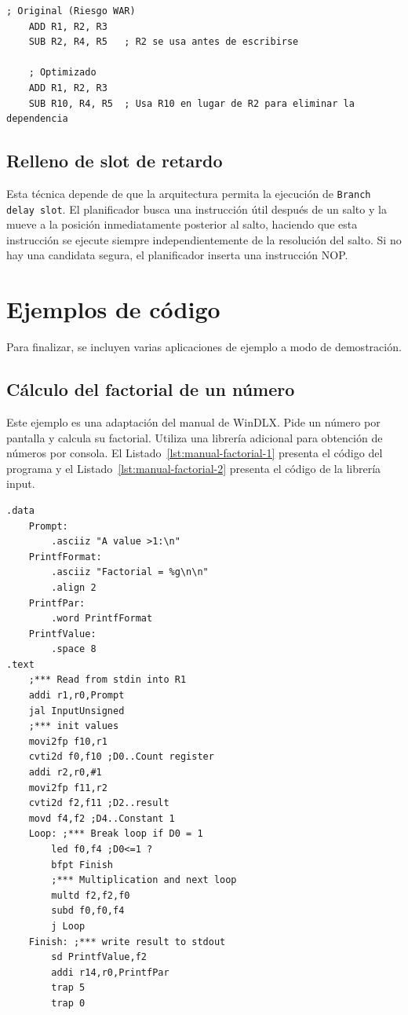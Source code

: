 \documentclass[../main.tex]{subfiles}
\begin{document}
\begin{lstlisting}[caption={Ejemplo de renombrado de registros.},label={lst:manual-renombrado}]
	; Original (Riesgo WAR)
	ADD R1, R2, R3
	SUB R2, R4, R5   ; R2 se usa antes de escribirse
	
	; Optimizado
	ADD R1, R2, R3
	SUB R10, R4, R5  ; Usa R10 en lugar de R2 para eliminar la dependencia
\end{lstlisting}

\subsection{Relleno de slot de retardo}

Esta técnica depende de que la arquitectura permita la ejecución de \texttt{Branch delay slot}. El planificador busca una instrucción útil después de un salto y la mueve a la posición inmediatamente posterior al salto, haciendo que esta instrucción se ejecute siempre independientemente de la resolución del salto. Si no hay una candidata segura, el planificador inserta una instrucción NOP.

\section{Ejemplos de código}

Para finalizar, se incluyen varias aplicaciones de ejemplo a modo de demostración.

\subsection{Cálculo del factorial de un número}

Este ejemplo es una adaptación del manual de WinDLX. Pide un número por pantalla y calcula su factorial. Utiliza una librería adicional para obtención de números por consola. El Listado~\ref{lst:manual-factorial-1} presenta el código del programa y el Listado~\ref{lst:manual-factorial-2} presenta el código de la librería input.

\begin{lstlisting}[caption={Programa factorial.},label={lst:manual-factorial-1}]
.data
	Prompt:
		.asciiz "A value >1:\n"
	PrintfFormat:
		.asciiz "Factorial = %g\n\n"
		.align 2
	PrintfPar:
		.word PrintfFormat
	PrintfValue:
		.space 8
.text
	;*** Read from stdin into R1
	addi r1,r0,Prompt
	jal InputUnsigned
	;*** init values
	movi2fp f10,r1
	cvti2d f0,f10 ;D0..Count register
	addi r2,r0,#1
	movi2fp f11,r2
	cvti2d f2,f11 ;D2..result
	movd f4,f2 ;D4..Constant 1
	Loop: ;*** Break loop if D0 = 1
		led f0,f4 ;D0<=1 ?
		bfpt Finish
		;*** Multiplication and next loop
		multd f2,f2,f0
		subd f0,f0,f4
		j Loop
	Finish: ;*** write result to stdout
		sd PrintfValue,f2
		addi r14,r0,PrintfPar
		trap 5
		trap 0
\end{lstlisting}
\end{document}
